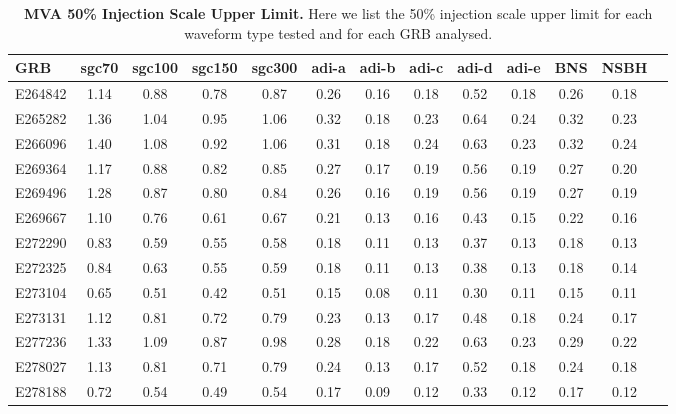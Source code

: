 \documentclass[11pt]{cuthesis}
\begin{document}
\begin{landscape}
\begin{table}
\centering
\begin{tabular}{l c  c  c  c  c  c  c  c c c c c |}
\hline
GRB & sgc70 &	sgc100 &	sgc150 &	sgc300 &	adi-a &	adi-b &	adi-c &	adi-d &	adi-e &	BNS &	NSBH \\
\hline		
E264842 & 1.14 & 0.88 & 0.78 & 0.87 & 0.26 & 0.16 & 0.18 & 0.52 & 0.18 & 0.26 & 0.18 \\                                                                         
E265282 & 1.36 & 1.04 & 0.95 & 1.06 & 0.32 & 0.18 & 0.23 & 0.64 & 0.24 & 0.32 & 0.23 \\									
E266096 & 1.40 & 1.08 & 0.92 & 1.06 & 0.31 & 0.18 & 0.24 & 0.63 & 0.23 & 0.32 & 0.24 \\
E269364 & 1.17 & 0.88 & 0.82 & 0.85 & 0.27 & 0.17 & 0.19 & 0.56 & 0.19 & 0.27 & 0.20 \\
E269496 & 1.28 & 0.87 & 0.80 & 0.84 & 0.26 & 0.16 & 0.19 & 0.56 & 0.19 & 0.27 & 0.19 \\
E269667 & 1.10 & 0.76 & 0.61 & 0.67 & 0.21 & 0.13 & 0.16 & 0.43 & 0.15 & 0.22 & 0.16 \\
E272290 & 0.83 & 0.59 & 0.55 & 0.58 & 0.18 & 0.11 & 0.13 & 0.37 & 0.13 & 0.18 & 0.13 \\
E272325 & 0.84 & 0.63 & 0.55 & 0.59 & 0.18 & 0.11 & 0.13 & 0.38 & 0.13 & 0.18 & 0.14 \\
E273104 & 0.65 & 0.51 & 0.42 & 0.51 & 0.15 & 0.08 & 0.11 & 0.30 & 0.11 & 0.15 & 0.11 \\
E273131 & 1.12 & 0.81 & 0.72 & 0.79 & 0.23 & 0.13 & 0.17 & 0.48 & 0.18 & 0.24 & 0.17 \\
E277236 & 1.33 & 1.09 & 0.87 & 0.98 & 0.28 & 0.18 & 0.22 & 0.63 & 0.23 & 0.29 & 0.22 \\
E278027 & 1.13 & 0.81 & 0.71 & 0.79 & 0.24 & 0.13 & 0.17 & 0.52 & 0.18 & 0.24 & 0.18 \\
E278188 & 0.72 & 0.54 & 0.49 & 0.54 & 0.17 & 0.09 & 0.12 & 0.33 & 0.12 & 0.17 & 0.12 \\
\end{tabular}
\caption{\textbf{MVA 50\% Injection Scale Upper Limit.} Here we list the 50\% injection scale upper limit for each waveform type tested and for each GRB analysed.}
\end{table}
\end{landscape}
\end{document}
